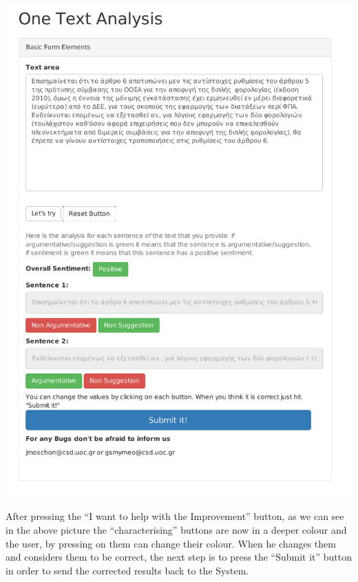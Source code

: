 \centerline{\includegraphics[width=0.9\linewidth]{figure/screens/screen3_vector.pdf}}

After pressing the ``I want to help with the Improvement'' button, as we can see in the above picture the ``characterising'' buttons are now in a deeper colour and the user, by pressing on them can change their colour. When he changes them and considers them to be correct, the next step is to press the ``Submit it'' button in order to send the corrected results back to the System.